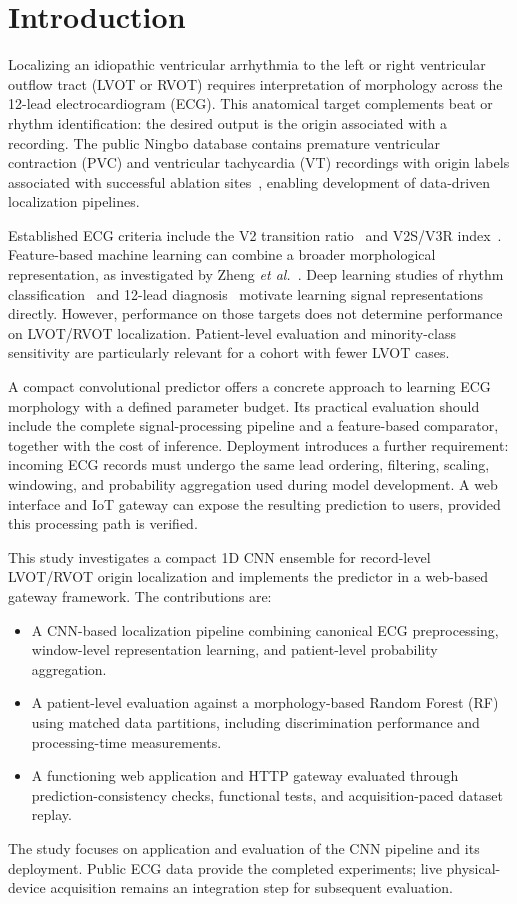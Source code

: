 \documentclass[conference,a4paper]{IEEEtran}
\begin{document}
\section{Introduction}
Localizing an idiopathic ventricular arrhythmia to the left or right ventricular outflow tract (LVOT or RVOT) requires interpretation of morphology across the 12-lead electrocardiogram (ECG). This anatomical target complements beat or rhythm identification: the desired output is the origin associated with a recording. The public Ningbo database contains premature ventricular contraction (PVC) and ventricular tachycardia (VT) recordings with origin labels associated with successful ablation sites~\cite{zheng2020}, enabling development of data-driven localization pipelines.

Established ECG criteria include the V2 transition ratio~\cite{betensky2011} and V2S/V3R index~\cite{yoshida2014}. Feature-based machine learning can combine a broader morphological representation, as investigated by Zheng \emph{et al.}~\cite{zheng2021}. Deep learning studies of rhythm classification~\cite{hannun2019} and 12-lead diagnosis~\cite{ribeiro2020} motivate learning signal representations directly. However, performance on those targets does not determine performance on LVOT/RVOT localization. Patient-level evaluation and minority-class sensitivity are particularly relevant for a cohort with fewer LVOT cases.

A compact convolutional predictor offers a concrete approach to learning ECG morphology with a defined parameter budget. Its practical evaluation should include the complete signal-processing pipeline and a feature-based comparator, together with the cost of inference. Deployment introduces a further requirement: incoming ECG records must undergo the same lead ordering, filtering, scaling, windowing, and probability aggregation used during model development. A web interface and IoT gateway can expose the resulting prediction to users, provided this processing path is verified.

This study investigates a compact 1D CNN ensemble for record-level LVOT/RVOT origin localization and implements the predictor in a web-based gateway framework. The contributions are:
\begin{itemize}
\item A CNN-based localization pipeline combining canonical ECG preprocessing, window-level representation learning, and patient-level probability aggregation.
\item A patient-level evaluation against a morphology-based Random Forest (RF) using matched data partitions, including discrimination performance and processing-time measurements.
\item A functioning web application and HTTP gateway evaluated through prediction-consistency checks, functional tests, and acquisition-paced dataset replay.
\end{itemize}
The study focuses on application and evaluation of the CNN pipeline and its deployment. Public ECG data provide the completed experiments; live physical-device acquisition remains an integration step for subsequent evaluation.
\end{document}
